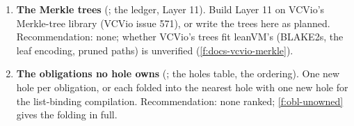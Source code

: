 \begin{enumerate}[leftmargin=*, itemsep=6pt]
\item \textbf{The Merkle trees} (; the ledger, Layer 11). Build Layer 11 on VCVio's
  Merkle-tree library (VCVio issue 571), or write the trees here as planned. Recommendation: none;
  whether VCVio's trees fit leanVM's (BLAKE2s, the leaf encoding, pruned paths) is unverified
  (\cref{f:docs-vcvio-merkle}).

\item \textbf{The obligations no hole owns} (; the holes table, the ordering). One new
  hole per obligation, or each folded into the nearest hole with one new hole for the list-binding
  compilation. Recommendation: none ranked; \cref{f:obl-unowned} gives the folding in full.
\end{enumerate}
